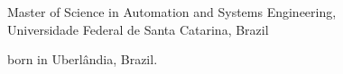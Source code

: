 \begin{titlepage}
\begin{center}
\bigskip
\bigskip

Master of Science in Automation and Systems Engineering, \\
Universidade Federal de Santa Catarina, Brazil

born in Uberlândia, Brazil.

\vspace*{2\bigskipamount}

\end{center}

\clearpage
\thispagestyle{empty}





    

\end{titlepage}
